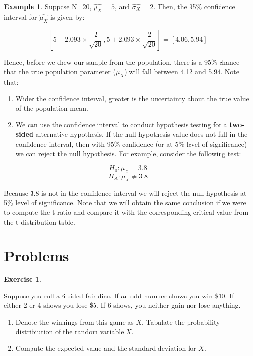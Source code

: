 \documentclass[
]{book}
\theoremstyle{definition}
\theoremstyle{definition}
\newtheorem{example}{Example}[chapter]
\theoremstyle{definition}
\newtheorem{exercise}{Exercise}[chapter]
\theoremstyle{definition}
\theoremstyle{remark}
\begin{document}
\begin{example}
\protect\hypertarget{exm:unnamed-chunk-53}{}\label{exm:unnamed-chunk-53}Suppose N=20, \(\hat{\mu_X}=5\), and \(\hat{\sigma_X}=2\). Then, the 95\% confidence interval for \(\hat{\mu_X}\) is given by:

\[\left[5-2.093 \times \frac{2}{\sqrt{20}}, 5+2.093 \times \frac{2}{\sqrt{20}} \right]=[4.06,5.94]\]

Hence, before we drew our sample from the population, there is a 95\% chance that the true population parameter (\(\mu_X\)) will fall between 4.12 and 5.94. Note that:

\begin{enumerate}
\def\labelenumi{\arabic{enumi}.}
\item
  Wider the confidence interval, greater is the uncertainty about the true value of the population mean.
\item
  We can use the confidence interval to conduct hypothesis testing for a \textbf{two-sided} alternative hypothesis. If the null hypothesis value does not fall in the confidence interval, then with 95\% confidence (or at 5\% level of significance) we can reject the null hypothesis. For example, consider the following test:
\end{enumerate}

\[H_0: \mu_X=3.8\]
\[H_A: \mu_X\neq 3.8\]

Because 3.8 is not in the confidence interval we will reject the null hypothesis at 5\% level of significance. Note that we will obtain the same conclusion if we were to compute the t-ratio and compare it with the corresponding critical value from the t-distribution table.
\end{example}

\hypertarget{problems-1}{%
\section*{Problems}\label{problems-1}}

\begin{exercise}
\protect\hypertarget{exr:unnamed-chunk-54}{}\label{exr:unnamed-chunk-54}

Suppose you roll a 6-sided fair dice. If an odd number shows you win \$10. If either 2 or 4 shows you lose \$5. If 6 shows, you neither gain nor lose anything.

\begin{enumerate}
\def\labelenumi{\alph{enumi}.}
\item
  Denote the winnings from this game as \(X\). Tabulate the probability distribiution of the random variable \(X\).
\item
  Compute the expected value and the standard deviation for \(X\).
\end{enumerate}

\end{exercise}
\end{document}
